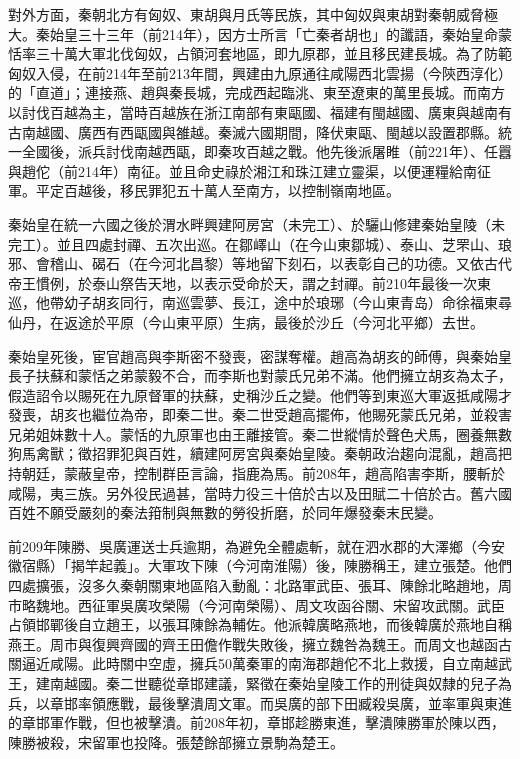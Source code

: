 對外方面，秦朝北方有匈奴、東胡與月氏等民族，其中匈奴與東胡對秦朝威脅極大。秦始皇三十三年（前214年），因方士所言「亡秦者胡也」的讖語，秦始皇命蒙恬率三十萬大軍北伐匈奴，占領河套地區，即九原郡，並且移民建長城。為了防範匈奴入侵，在前214年至前213年間，興建由九原通往咸陽西北雲揚（今陝西淳化）的「直道」；連接燕、趙與秦長城，完成西起臨洮、東至遼東的萬里長城。而南方以討伐百越為主，當時百越族在浙江南部有東甌國、福建有閩越國、廣東與越南有古南越國、廣西有西甌國與雒越。秦滅六國期間，降伏東甌、閩越以設置郡縣。統一全國後，派兵討伐南越西甌，即秦攻百越之戰。他先後派屠睢（前221年）、任囂與趙佗（前214年）南征。並且命史祿於湘江和珠江建立靈渠，以便運糧給南征軍。平定百越後，移民罪犯五十萬人至南方，以控制嶺南地區。

秦始皇在統一六國之後於渭水畔興建阿房宮（未完工）、於驪山修建秦始皇陵（未完工）。並且四處封禪、五次出巡。在鄒嶧山（在今山東鄒城）、泰山、芝罘山、琅邪、會稽山、碣石（在今河北昌黎）等地留下刻石，以表彰自己的功德。又依古代帝王慣例，於泰山祭告天地，以表示受命於天，謂之封禪。前210年最後一次東巡，他帶幼子胡亥同行，南巡雲夢、長江，途中於琅琊（今山東青岛）命徐福東尋仙丹，在返途於平原（今山東平原）生病，最後於沙丘（今河北平鄉）去世。

秦始皇死後，宦官趙高與李斯密不發喪，密謀奪權。趙高為胡亥的師傅，與秦始皇長子扶蘇和蒙恬之弟蒙毅不合，而李斯也對蒙氏兄弟不滿。他們擁立胡亥為太子，假造詔令以賜死在九原督軍的扶蘇，史稱沙丘之變。他們等到東巡大軍返抵咸陽才發喪，胡亥也繼位為帝，即秦二世。秦二世受趙高擺佈，他賜死蒙氏兄弟，並殺害兄弟姐妹數十人。蒙恬的九原軍也由王離接管。秦二世縱情於聲色犬馬，圈養無數狗馬禽獸；徵招罪犯與百姓，續建阿房宮與秦始皇陵。秦朝政治趨向混亂，趙高把持朝廷，蒙蔽皇帝，控制群臣言論，指鹿為馬。前208年，趙高陷害李斯，腰斬於咸陽，夷三族。另外役民過甚，當時力役三十倍於古以及田賦二十倍於古。舊六國百姓不願受嚴刻的秦法箝制與無數的勞役折磨，於同年爆發秦末民變。

前209年陳勝、吳廣運送士兵逾期，為避免全體處斬，就在泗水郡的大澤鄉（今安徽宿縣）「揭竿起義」。大軍攻下陳（今河南淮陽）後，陳勝稱王，建立張楚。他們四處擴張，沒多久秦朝關東地區陷入動亂：北路軍武臣、張耳、陳餘北略趙地，周市略魏地。西征軍吳廣攻榮陽（今河南榮陽）、周文攻函谷關、宋留攻武關。武臣占領邯鄲後自立趙王，以張耳陳餘為輔佐。他派韓廣略燕地，而後韓廣於燕地自稱燕王。周市與復興齊國的齊王田儋作戰失敗後，擁立魏咎為魏王。而周文也越函古關逼近咸陽。此時關中空虛，擁兵50萬秦軍的南海郡趙佗不北上救援，自立南越武王，建南越國。秦二世聽從章邯建議，緊徵在秦始皇陵工作的刑徒與奴隸的兒子為兵，以章邯率領應戰，最後擊潰周文軍。而吳廣的部下田臧殺吳廣，並率軍與東進的章邯軍作戰，但也被擊潰。前208年初，章邯趁勝東進，擊潰陳勝軍於陳以西，陳勝被殺，宋留軍也投降。張楚餘部擁立景駒為楚王。

